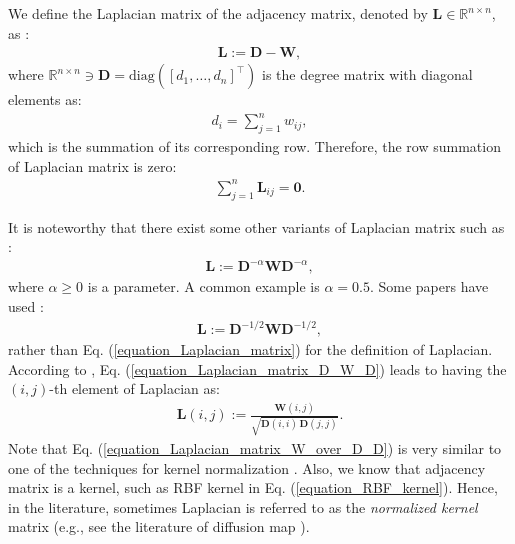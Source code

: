 \documentclass[lang=cn,10pt]{gorgeousnbook}
\numberwithin{equation}{section}%
\numberwithin{figure}{section}%
\begin{document}
We define the Laplacian matrix of the adjacency matrix, denoted by $\boldsymbol{L} \in \mathbb{R}^{n \times n}$, as \cite{merris1994laplacian}:
\begin{align}\label{equation_Laplacian_matrix}
\boldsymbol{L} := \boldsymbol{D} - \boldsymbol{W},
\end{align}
where $\mathbb{R}^{n \times n} \ni \boldsymbol{D} = \text{diag}([d_1, \dots, d_n]^\top)$ is the degree matrix with diagonal elements as:
\begin{align}\label{equation_degree_matrix}
d_i = \sum_{j=1}^n w_{ij},
\end{align}
which is the summation of its corresponding row. 
Therefore, the row summation of Laplacian matrix is zero:
\begin{align}\label{equation_Laplacian_row_sum}
\sum_{j=1}^n \boldsymbol{L}_{ij} = \boldsymbol{0}.
\end{align}

It is noteworthy that there exist some other variants of Laplacian matrix such as \cite{weiss1999segmentation,ng2001spectral}:
\begin{align}\label{equation_Laplacian_matrix_2}
\boldsymbol{L} := \boldsymbol{D}^{-\alpha} \boldsymbol{W} \boldsymbol{D}^{-\alpha},
\end{align}
where $\alpha \geq 0$ is a parameter. A common example is $\alpha=0.5$. 
Some papers have used \cite{weiss1999segmentation,ng2001spectral}:
\begin{align}\label{equation_Laplacian_matrix_D_W_D}
\boldsymbol{L} := \boldsymbol{D}^{-1/2} \boldsymbol{W} \boldsymbol{D}^{-1/2},
\end{align}
rather than Eq. (\ref{equation_Laplacian_matrix}) for the definition of Laplacian.  
According to \cite{weiss1999segmentation}, Eq. (\ref{equation_Laplacian_matrix_D_W_D}) leads to having the $(i,j)$-th element of Laplacian as:
\begin{align}\label{equation_Laplacian_matrix_W_over_D_D}
\boldsymbol{L}(i,j) := \frac{\boldsymbol{W}(i,j)}{\sqrt{\boldsymbol{D}(i,i)\, \boldsymbol{D}(j,j)}}.
\end{align}
Note that Eq. (\ref{equation_Laplacian_matrix_W_over_D_D}) is very similar to one of the techniques for kernel normalization \cite{ah2010normalized}. Also, we know that adjacency matrix is a kernel, such as RBF kernel in Eq. (\ref{equation_RBF_kernel}). Hence, in the literature, sometimes Laplacian is referred to as the \textit{normalized kernel} matrix (e.g., see the literature of diffusion map \cite{coifman2006diffusion,nadler2006diffusion2}). 
\end{document}
